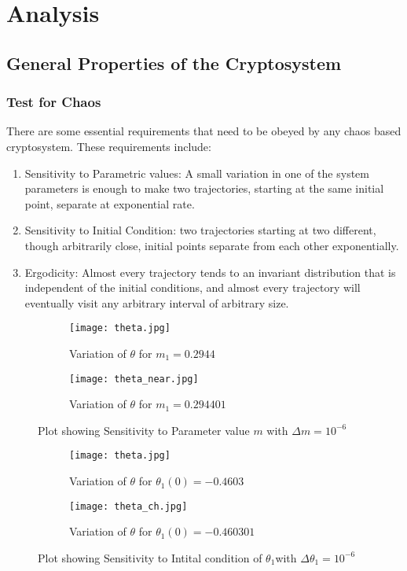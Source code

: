 \section{Analysis}
\subsection{General Properties of the Cryptosystem}
\subsubsection{Test for Chaos}
There are some essential requirements that need to be obeyed by any chaos based cryptosystem. These requirements include:
\begin{enumerate}
	\item Sensitivity to Parametric values: A small variation in one of the system parameters is enough to make two trajectories, starting at the same initial point, separate at exponential rate.
	\item Sensitivity to Initial  Condition:  two  trajectories  starting  at  two  different,  though  arbitrarily  close,  initial points separate from each other exponentially.
	\item Ergodicity:  Almost every trajectory tends to an invariant distribution that is independent of the initial conditions, and almost every trajectory will eventually visit any arbitrary interval of arbitrary size.
\end{enumerate}

\begin{figure}[H]
\begin{subfigure}{0.5\textwidth}
\texttt{[image: theta.jpg]}
\caption{Variation of ${\theta}$ for ${m_{1}=0.2944}$}\label{fig:theta_comp}
\end{subfigure}
\begin{subfigure}{0.5\textwidth}
\texttt{[image: theta\_near.jpg]}
\caption{Variation of ${\theta}$ for ${m_{1}=0.294401}$}\label{fig:trajectory_near_comp}
\end{subfigure}
\caption{Plot showing Sensitivity to Parameter value ${m}$ with ${\Delta m = 10^{-6}}$}\label{fig:image6}
\end{figure}

\begin{figure}[H]
\begin{subfigure}{0.5\textwidth}
\texttt{[image: theta.jpg]}
\caption{Variation of ${\theta}$ for ${\theta_{1}(0)=-0.4603}$}\label{fig:theta_comp}
\end{subfigure}
\begin{subfigure}{0.5\textwidth}
\texttt{[image: theta\_ch.jpg]}
\caption{Variation of ${\theta}$ for ${\theta_{1}(0)=-0.460301}$}\label{fig:theta_ch_comp}
\end{subfigure}
\caption{Plot showing Sensitivity to Intital condition of ${\theta_{1}}$with ${\Delta \theta_{1} = 10^{-6}}$}\label{fig:image7}
\end{figure}

